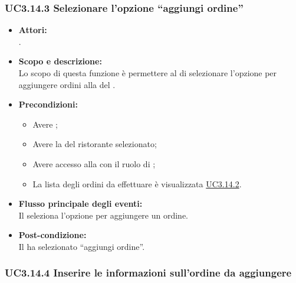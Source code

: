 \subsubsection{UC3.14.3 Selezionare l'opzione “aggiungi ordine”} \label{UC3.14.3}

\begin{itemize}
	\item \textbf{Attori:}
	\\.
	\item \textbf{Scopo e descrizione:} 
	\\Lo scopo di questa funzione è permettere al  di selezionare l'opzione per aggiungere ordini alla  del .
	\item \textbf{Precondizioni:}
	\begin{itemize}
		\item Avere ;
		\item Avere la  del ristorante selezionato;
		\item Avere accesso alla  con il ruolo di ;
		\item La lista degli ordini da effettuare è visualizzata \hyperref[UC3.14.2]{UC3.14.2}.
	\end{itemize}
	\item \textbf{Flusso principale degli eventi:}
	\\Il {} seleziona l'opzione per aggiungere un ordine.
	\item \textbf{Post-condizione:}
	\\Il {} ha selezionato “aggiungi ordine”.
\end{itemize}

\subsubsection{UC3.14.4 Inserire le informazioni sull'ordine da aggiungere} \label{UC3.14.4}

